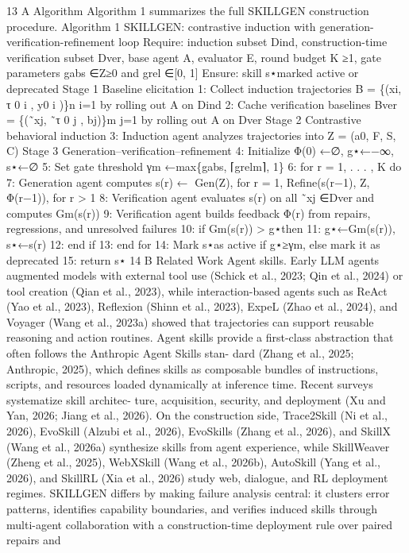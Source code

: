 13
A
Algorithm
Algorithm 1 summarizes the full SKILLGEN construction procedure.
Algorithm 1 SKILLGEN: contrastive induction with generation-verification-refinement loop
Require: induction subset Dind, construction-time verification subset Dver, base agent A, evaluator
E, round budget K ≥1, gate parameters gabs ∈Z≥0 and grel ∈[0, 1]
Ensure: skill s⋆marked active or deprecated
Stage 1 Baseline elicitation
1: Collect induction trajectories B = \{(xi, τ 0
i , y0
i )\}n
i=1 by rolling out A on Dind
2: Cache verification baselines Bver = \{(˜xj, ˜τ 0
j , bj)\}m
j=1 by rolling out A on Dver
Stage 2 Contrastive behavioral induction
3: Induction agent analyzes trajectories into Z = (a0, F, S, C)
Stage 3 Generation–verification–refinement
4: Initialize Φ(0) ←∅, g⋆←−∞, s⋆←∅
5: Set gate threshold γm ←max\{gabs, ⌈grelm⌉, 1\}
6: for r = 1, . . . , K do
7:
Generation agent computes s(r) ←
Gen(Z),
for r = 1,
Refine(s(r−1), Z, Φ(r−1)),
for r > 1
8:
Verification agent evaluates s(r) on all ˜xj ∈Dver and computes Gm(s(r))
9:
Verification agent builds feedback Φ(r) from repairs, regressions, and unresolved failures
10:
if Gm(s(r)) > g⋆then
11:
g⋆←Gm(s(r)), s⋆←s(r)
12:
end if
13: end for
14: Mark s⋆as active if g⋆≥γm, else mark it as deprecated
15: return s⋆
14
B
Related Work
Agent skills. Early LLM agents augmented models with external tool use (Schick et al., 2023; Qin
et al., 2024) or tool creation (Qian et al., 2023), while interaction-based agents such as ReAct (Yao
et al., 2023), Reflexion (Shinn et al., 2023), ExpeL (Zhao et al., 2024), and Voyager (Wang et al.,
2023a) showed that trajectories can support reusable reasoning and action routines.
Agent skills provide a first-class abstraction that often follows the Anthropic Agent Skills stan-
dard (Zhang et al., 2025; Anthropic, 2025), which defines skills as composable bundles of instructions,
scripts, and resources loaded dynamically at inference time. Recent surveys systematize skill architec-
ture, acquisition, security, and deployment (Xu and Yan, 2026; Jiang et al., 2026). On the construction
side, Trace2Skill (Ni et al., 2026), EvoSkill (Alzubi et al., 2026), EvoSkills (Zhang et al., 2026),
and SkillX (Wang et al., 2026a) synthesize skills from agent experience, while SkillWeaver (Zheng
et al., 2025), WebXSkill (Wang et al., 2026b), AutoSkill (Yang et al., 2026), and SkillRL (Xia et al.,
2026) study web, dialogue, and RL deployment regimes. SKILLGEN differs by making failure
analysis central: it clusters error patterns, identifies capability boundaries, and verifies induced skills
through multi-agent collaboration with a construction-time deployment rule over paired repairs and
